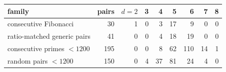 \begin{tabular}{@{}lrrrrrrrr@{}}\toprule family & pairs & $d{=}2$ & 3 & 4 & 5 & 6 & 7 & 8\\\midrule
consecutive Fibonacci & 30 & 1 & 0 & 3 & 17 & 9 & 0 & 0 \\
ratio-matched generic pairs & 41 & 0 & 0 & 4 & 18 & 19 & 0 & 0 \\
consecutive primes $<1200$ & 195 & 0 & 0 & 8 & 62 & 110 & 14 & 1 \\
random pairs $<1200$ & 150 & 0 & 4 & 37 & 81 & 24 & 4 & 0 \\
\bottomrule\end{tabular}
